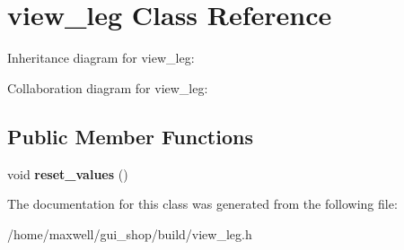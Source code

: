 \hypertarget{classview__leg}{}\section{view\+\_\+leg Class Reference}
\label{classview__leg}


Inheritance diagram for view\+\_\+leg\+:


Collaboration diagram for view\+\_\+leg\+:
\subsection*{Public Member Functions}
\begin{DoxyCompactItemize}
\item 
void {\bfseries reset\+\_\+values} ()\hypertarget{classview__leg_a2220bc5d7006d15837aa291fcd36744e}{}\label{classview__leg_a2220bc5d7006d15837aa291fcd36744e}

\end{DoxyCompactItemize}


The documentation for this class was generated from the following file\+:\begin{DoxyCompactItemize}
\item 
/home/maxwell/gui\+\_\+shop/build/view\+\_\+leg.\+h\end{DoxyCompactItemize}
